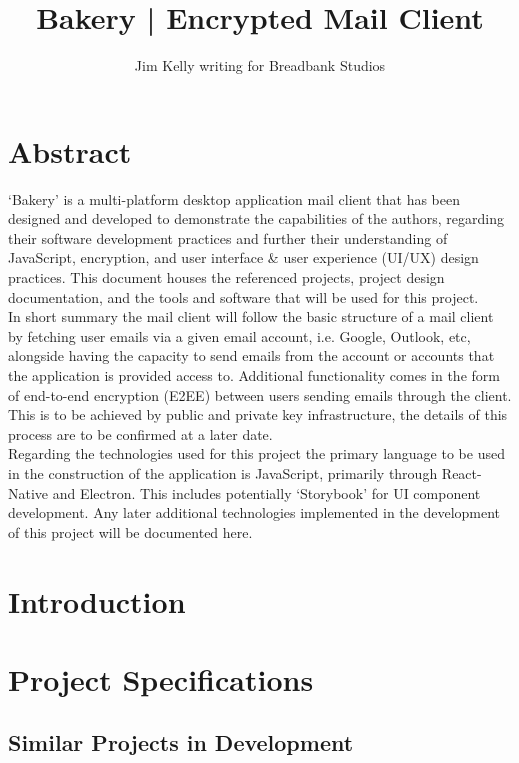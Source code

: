 \documentclass[12pt]{article}
\title{Bakery | Encrypted Mail Client}
\author{Jim Kelly writing for Breadbank Studios}
\begin{document}
\maketitle
\vspace{40pt}
\section*{Abstract}
	\noindent `Bakery' is a multi-platform desktop application mail client that has been designed and developed to demonstrate the capabilities of the authors, regarding their software development practices and further their understanding of JavaScript, encryption, and user interface \& user experience (UI/UX) design practices. This document houses the referenced projects, project design documentation, and the tools and software that will be used for this project.\\
	\newline
	\noindent In short summary the mail client will follow the basic structure of a mail client by fetching user emails via a given email account, i.e. Google, Outlook, etc, alongside having the capacity to send emails from the account or accounts that the application is provided access to. Additional functionality comes in the form of end-to-end encryption (E2EE) between users sending emails through the client. This is to be achieved by public and private key infrastructure, the details of this process are to be confirmed at a later date.\\
	\newline
	\noindent Regarding the technologies used for this project the primary language to be used in the construction of the application is JavaScript, primarily through React-Native and Electron. This includes potentially `Storybook'\cite{storybooks} for UI component development. Any later additional technologies implemented in the development of this project will be documented here.
\pagebreak
\tableofcontents
\pagebreak
\section{Introduction}
\lipsum[1]
\section{Project Specifications}
\subsection{Similar Projects in Development}
\lipsum[1]
\pagebreak


\end{document}
